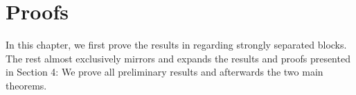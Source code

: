 \chapter{Proofs}

\label{chapter:proofs}

In this chapter, we first prove the results in \cite{[16]deo1975functional} regarding strongly separated blocks. The rest almost exclusively mirrors and expands the results and proofs presented in \cite{[0]BUCCHIA2017344} Section 4: We prove all preliminary results and afterwards the two main theorems.







